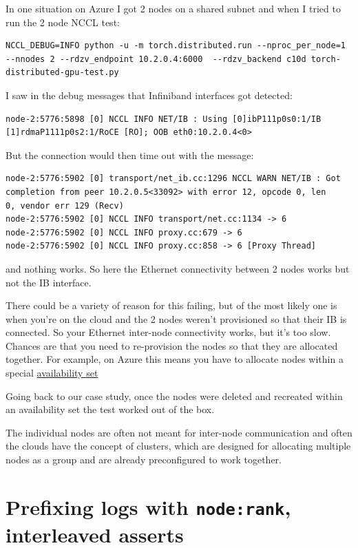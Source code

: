 \documentclass[
]{report}
\begin{document}
In one situation on Azure I got 2 nodes on a shared subnet and when I
tried to run the 2 node NCCL test:

\begin{verbatim}
NCCL_DEBUG=INFO python -u -m torch.distributed.run --nproc_per_node=1 --nnodes 2 --rdzv_endpoint 10.2.0.4:6000  --rdzv_backend c10d torch-distributed-gpu-test.py
\end{verbatim}

I saw in the debug messages that Infiniband interfaces got detected:

\begin{verbatim}
node-2:5776:5898 [0] NCCL INFO NET/IB : Using [0]ibP111p0s0:1/IB [1]rdmaP1111p0s2:1/RoCE [RO]; OOB eth0:10.2.0.4<0>
\end{verbatim}

But the connection would then time out with the message:

\begin{verbatim}
node-2:5776:5902 [0] transport/net_ib.cc:1296 NCCL WARN NET/IB : Got completion from peer 10.2.0.5<33092> with error 12, opcode 0, len
0, vendor err 129 (Recv)
node-2:5776:5902 [0] NCCL INFO transport/net.cc:1134 -> 6
node-2:5776:5902 [0] NCCL INFO proxy.cc:679 -> 6
node-2:5776:5902 [0] NCCL INFO proxy.cc:858 -> 6 [Proxy Thread]
\end{verbatim}

and nothing works. So here the Ethernet connectivity between 2 nodes
works but not the IB interface.

There could be a variety of reason for this failing, but of the most
likely one is when you're on the cloud and the 2 nodes weren't
provisioned so that their IB is connected. So your Ethernet inter-node
connectivity works, but it's too slow. Chances are that you need to
re-provision the nodes so that they are allocated together. For example,
on Azure this means you have to allocate nodes within a special
\href{https://learn.microsoft.com/en-us/azure/virtual-machines/availability-set-overview?source=recommendations}{availability
set}

Going back to our case study, once the nodes were deleted and recreated
within an availability set the test worked out of the box.

The individual nodes are often not meant for inter-node communication
and often the clouds have the concept of clusters, which are designed
for allocating multiple nodes as a group and are already preconfigured
to work together.

\section{\texorpdfstring{Prefixing logs with \texttt{node:rank},
interleaved
asserts}{Prefixing logs with node:rank, interleaved asserts}}\label{prefixing-logs-with-noderank-interleaved-asserts}
\end{document}
